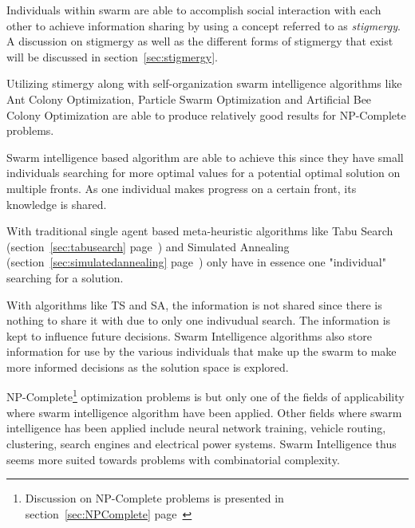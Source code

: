 Individuals within swarm are able to accomplish social interaction with each other to achieve information sharing by using a concept referred to as \emph{stigmergy}\cite{SwarmArt,CompuIntelligenceIntro,FundamentalSwarm}. A discussion on stigmergy as well as the different forms of stigmergy that exist will be discussed in section~\ref{sec:stigmergy}.

Utilizing stimergy along with self-organization swarm intelligence algorithms like Ant Colony Optimization, Particle Swarm Optimization and Artificial Bee Colony Optimization are able to produce relatively good results for NP-Complete problems\cite{CompuIntelligenceIntro,FundamentalSwarm,SwarmArt}. 

Swarm intelligence based algorithm are able to achieve this since they have small individuals searching for more optimal values for a potential optimal solution on multiple fronts. As one individual makes progress on a certain front, its knowledge is shared\cite{CompuIntelligenceIntro,FundamentalSwarm}. 

With traditional single agent based meta-heuristic algorithms like Tabu Search (section~\ref{sec:tabusearch} page~\pageref{sec:tabusearch}) and Simulated Annealing (section~\ref{sec:simulatedannealing} page~\pageref{sec:simulatedannealing}) only have in essence one "individual" searching for a solution\cite{CompuIntelligenceIntro,FundamentalSwarm}. 

With algorithms like TS and SA, the information is not shared since there is nothing to share it with due to only one indivudual search\cite{CompuIntelligenceIntro,FundamentalSwarm,SASingleMultiObj,TSHazardous}. The information is kept to influence future decisions\cite{AIModernApproach,TabuMontemanniSmith,TabuVechicleRoutingWithTimeWindows,CurveFittingSA,EcoEquilSA}. Swarm Intelligence algorithms also store information for use by the various individuals that make up the swarm to make more informed decisions as the solution space is explored\cite{CompuIntelligenceIntro,FundamentalSwarm}.

NP-Complete\footnote{Discussion on NP-Complete problems is presented in section~\ref{sec:NPComplete} page~\pageref{sec:NPComplete}} optimization problems is but only one of the fields of applicability where swarm intelligence algorithm have been applied. Other fields where swarm intelligence has been applied include neural network training\cite{CompuIntelligenceIntro}, vehicle routing\cite{ACOSurvey}, clustering\cite{AntSwarmClustering}, search engines and electrical power systems\cite{SAElectricPower}. Swarm Intelligence thus seems more suited towards problems with combinatorial complexity\cite{SIOPDenby}.

